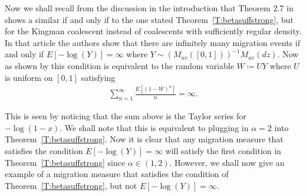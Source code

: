 \documentclass[11pt]{article}
\theoremstyle{definition}
\newcommand{\thmref}[1]{Theorem~\ref{T:#1}}
\begin{document}
\noindent Now we shall recall from the discussion in the introduction that Theorem 2.7 in \cite{seedbank2} shows a similar if and only if to the one stated \thmref{betasuffstrong}, but for the Kingman coalescent instead of coalescents with sufficiently regular density. In that article the authors show that there are infinitely many migration events if and only if $E[-\log(Y)] = \infty$ where $Y \sim (M_{uv}([0,1]))^{-1}M_{uv}(dz)$. Now as shown by \cite{seedbank2} this condition is equivalent to the random variable $W \coloneqq UY$ where $U$ is uniform on $[0,1]$ satisfying 
%
\begin{align*}
    \sum_{n=1}^\infty \frac{E[(1-W)^{n}]}{n} = \infty.
\end{align*}

\noindent This is seen by noticing that the sum above is the Taylor series for $-\log(1-x)$. We shall note that this is equivalent to plugging in $\alpha = 2$ into \thmref{betasuffstrong}. Now it is clear that any migration measure that satisfies the condition $E[-\log(Y)] = \infty$ will satisfy the first condition in \thmref{betasuffstrong} since $\alpha \in (1,2)$. However, we shall now give an example of a migration measure that satisfies the condition of \thmref{betasuffstrong}, but not $E[-\log(Y)] = \infty$.
\end{document}
